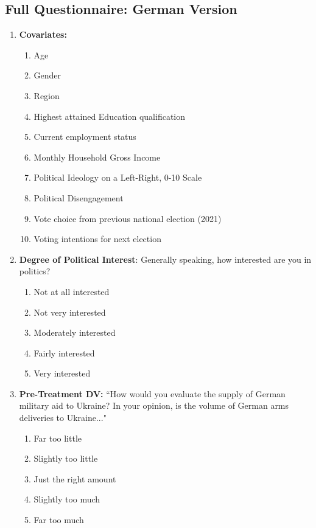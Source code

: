 \begin{appendices}
\section{Full Questionnaire: German Version}
\begin{enumerate}
    \item \textbf{Covariates:}
    \begin{enumerate}
        \item Age 
        \item Gender
        \item Region 
        \item Highest attained Education qualification
        \item Current employment status
        \item Monthly Household Gross Income
        \item Political Ideology on a Left-Right, 0-10 Scale
        \item Political Disengagement
        \item Vote choice from previous national election (2021)
        \item Voting intentions for next election
    \end{enumerate}
     \item \textbf{Degree of Political Interest}: Generally speaking, how interested are you in politics?
    \begin{enumerate}
        \item Not at all interested
        \item Not very interested
        \item Moderately interested
        \item Fairly interested
        \item Very interested 
    \end{enumerate}
    \item \textbf{Pre-Treatment DV:}  ``How would you evaluate the supply of German military aid to Ukraine? In your opinion, is the volume of German arms deliveries to Ukraine..." 
        \begin{enumerate}
            \item Far too little
            \item Slightly too little
            \item Just the right amount
            \item Slightly too much
            \item Far too much 
        \end{enumerate}

\end{enumerate}
\end{appendices}
